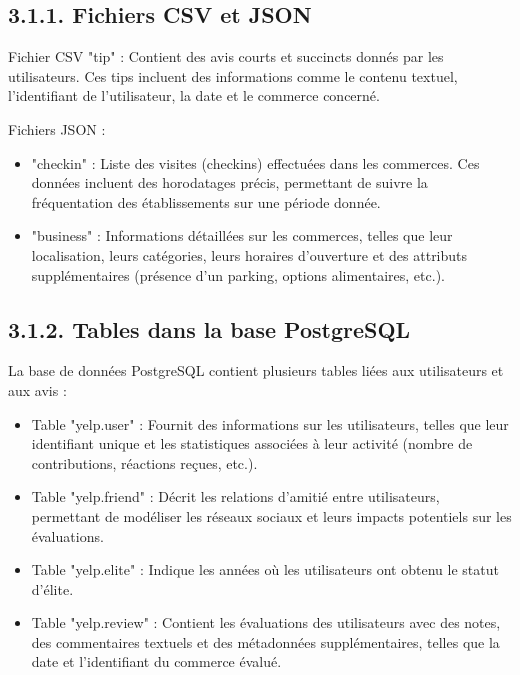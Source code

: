 \subsection*{3.1.1. Fichiers CSV et JSON}

Fichier CSV "tip" : Contient des avis courts et succincts donnés par les utilisateurs. Ces tips incluent des informations comme le contenu textuel, l’identifiant de l’utilisateur, la date et le commerce concerné.


Fichiers JSON :

\begin{itemize}
\item "checkin" : Liste des visites (checkins) effectuées dans les commerces. Ces données incluent des horodatages précis, permettant de suivre la fréquentation des établissements sur une période donnée.


\item "business" : Informations détaillées sur les commerces, telles que leur localisation, leurs catégories, leurs horaires d'ouverture et des attributs supplémentaires (présence d’un parking, options alimentaires, etc.).


\end{itemize}

\subsection*{3.1.2. Tables dans la base PostgreSQL}
La base de données PostgreSQL contient plusieurs tables liées aux utilisateurs et aux avis :

\begin{itemize}
\item Table "yelp.user" : Fournit des informations sur les utilisateurs, telles que leur identifiant unique et les statistiques associées à leur activité (nombre de contributions, réactions reçues, etc.).


\item Table "yelp.friend" : Décrit les relations d’amitié entre utilisateurs, permettant de modéliser les réseaux sociaux et leurs impacts potentiels sur les évaluations.


\item Table "yelp.elite" : Indique les années où les utilisateurs ont obtenu le statut d’élite.


\item Table "yelp.review" : Contient les évaluations des utilisateurs avec des notes, des commentaires textuels et des métadonnées supplémentaires, telles que la date et l’identifiant du commerce évalué.


\end{itemize}


